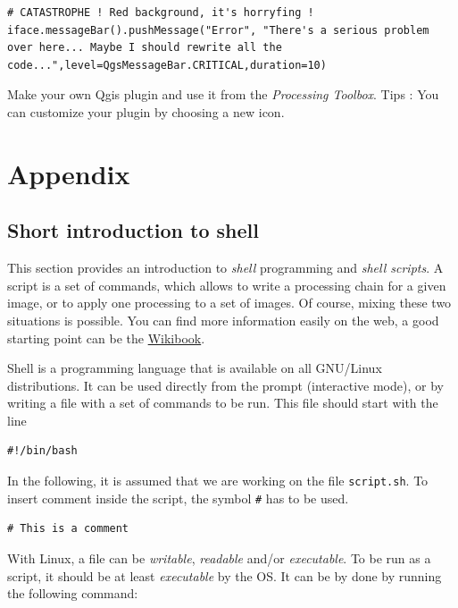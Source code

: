 \documentclass[a4paper,11pt,DIV=18]{scrartcl}
\begin{document}
\begin{enumerate}
\begin{verbatim}
# CATASTROPHE ! Red background, it's horryfing !
iface.messageBar().pushMessage("Error", "There's a serious problem over here... Maybe I should rewrite all the code...",level=QgsMessageBar.CRITICAL,duration=10)

\end{verbatim}


\begin{work}
Make your own Qgis plugin and use it from the \emph{Processing Toolbox}.
Tips : You can customize your plugin by choosing a new icon.
\end{work}
\end{enumerate}



\section{Appendix}
\label{sec:org52671e4}
\subsection{Short introduction to shell}
\label{sec:org1ef9f35}
This section provides  an introduction to \emph{shell}  programming and \emph{shell
scripts}.   A script  is a  set of  commands, which  allows to  write a
processing chain  for a given image,  or to apply one  processing to a
set  of   images.   Of   course,  mixing   these  two   situations  is
possible. You  can find  more information  easily on  the web,  a good
starting point can be the \href{https://en.wikibooks.org/wiki/Bash\_Shell\_Scripting}{Wikibook}.

Shell is  a programming  language that is  available on  all GNU/Linux
distributions. It  can be used  directly from the  prompt (interactive
mode), or  by writing a file  with a set  of commands to be  run. This
file should start with the line

\begin{verbatim}
#!/bin/bash
\end{verbatim}
In  the following,  it is  assumed  that we  are working  on the  file
\texttt{script.sh}. To insert comment inside the script, the symbol \texttt{\#} has to be
used.

\begin{verbatim}
# This is a comment
\end{verbatim}
With Linux, a file can be  \emph{writable}, \emph{readable} and/or \emph{executable}. To be
run as a script, it should be at least \emph{executable} by the OS. It can be
by done by running the following command:
\end{document}
